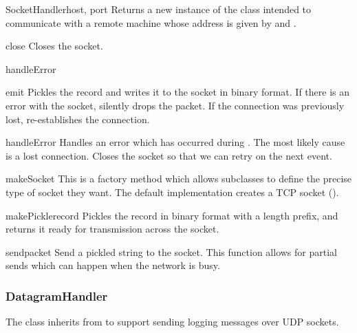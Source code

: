 \begin{classdesc}{SocketHandler}{host, port}
Returns a new instance of the  class intended to
communicate with a remote machine whose address is given by 
and .
\end{classdesc}

\begin{methoddesc}{close}{}
Closes the socket.
\end{methoddesc}

\begin{methoddesc}{handleError}{}
\end{methoddesc}

\begin{methoddesc}{emit}{}
Pickles the record and writes it to the socket in binary format.
If there is an error with the socket, silently drops the packet.
If the connection was previously lost, re-establishes the connection.
\end{methoddesc}

\begin{methoddesc}{handleError}{}
Handles an error which has occurred during . The
most likely cause is a lost connection. Closes the socket so that
we can retry on the next event.
\end{methoddesc}

\begin{methoddesc}{makeSocket}{}
This is a factory method which allows subclasses to define the precise
type of socket they want. The default implementation creates a TCP
socket ().
\end{methoddesc}

\begin{methoddesc}{makePickle}{record}
Pickles the record in binary format with a length prefix, and returns
it ready for transmission across the socket.
\end{methoddesc}

\begin{methoddesc}{send}{packet}
Send a pickled string  to the socket. This function allows
for partial sends which can happen when the network is busy.
\end{methoddesc}

\subsubsection{DatagramHandler}

The  class inherits from 
to support sending logging messages over UDP sockets.

